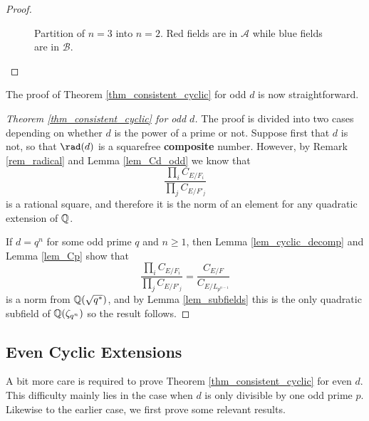 \begin{proof}
\begin{figure}[!ht]
        \caption[short]{Partition of $n=3$ into $n=2$. Red fields are in $\mathcal{A}$ while blue fields are in $\mathcal{B}$.}
    \end{figure}
\end{proof}

The proof of Theorem \ref{thm_consistent_cyclic} for odd $d$ is now straightforward.

\begin{proof}[Theorem \ref{thm_consistent_cyclic} for odd $d$]
    The proof is divided into two cases depending on whether $d$ is the power of a prime or not. Suppose first that $d$ is not, so that $\rad(d)$ is a squarefree \textbf{composite} number. However, by Remark \ref{rem_radical} and Lemma \ref{lem_Cd_odd} we know that 
    $$\frac{\prod_i C_{E/F_i}}{\prod_j C_{E/F'_j}}$$
    is a rational square, and therefore it is the norm of an element for any quadratic extension of $\mathbb{Q}$. 

    If $d=q^n$ for some odd prime $q$ and $n\geq1$, then Lemma \ref{lem_cyclic_decomp} and Lemma \ref{lem_Cp} show that 
    $$\frac{\prod_i C_{E/F_i}}{\prod_j C_{E/F'_j}}=\frac{C_{E/F}}{C_{E/L_{p^{n-1}}}}$$ is a norm from $\mathbb{Q}(\sqrt{q^*})$, and by Lemma \ref{lem_subfields} this is the only quadratic subfield of $\mathbb{Q}(\zeta_{q^n})$ so the result follows.
\end{proof}
 
\subsection*{Even Cyclic Extensions}
A bit more care is required to prove Theorem \ref{thm_consistent_cyclic} for even $d$. This difficulty mainly lies in the case when $d$ is only divisible by one odd prime $p$. Likewise to the earlier case, we first prove some relevant results.

